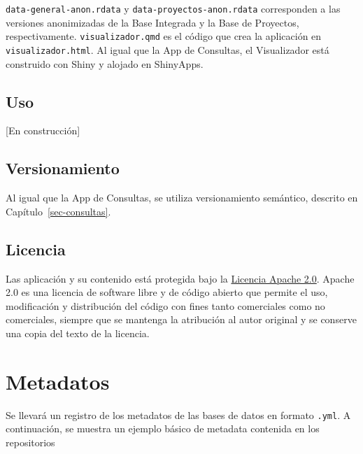 \documentclass[
  spanish,
  letterpaper,
  DIV=11,
  numbers=noendperiod]{scrreprt}
\begin{document}
\texttt{data-general-anon.rdata} y \texttt{data-proyectos-anon.rdata}
corresponden a las versiones anonimizadas de la Base Integrada y la Base
de Proyectos, respectivamente. \texttt{visualizador.qmd} es el código
que crea la aplicación en \texttt{visualizador.html}. Al igual que la
App de Consultas, el Visualizador está construido con Shiny y alojado en
ShinyApps.

\section{Uso}\label{uso-1}

{[}En construcción{]}

\section{Versionamiento}\label{versionamiento-1}

Al igual que la App de Consultas, se utiliza versionamiento semántico,
descrito en Capítulo~\ref{sec-consultas}.

\section{Licencia}\label{licencia-2}

Las aplicación y su contenido está protegida bajo la
\href{https://www.apache.org/licenses/LICENSE-2.0}{Licencia Apache 2.0}.
Apache 2.0 es una licencia de software libre y de código abierto que
permite el uso, modificación y distribución del código con fines tanto
comerciales como no comerciales, siempre que se mantenga la atribución
al autor original y se conserve una copia del texto de la licencia.


\chapter{Metadatos}\label{sec-metadata}

Se llevará un registro de los metadatos de las bases de datos en formato
\texttt{.yml}. A continuación, se muestra un ejemplo básico de metadata
contenida en los repositorios
\end{document}
